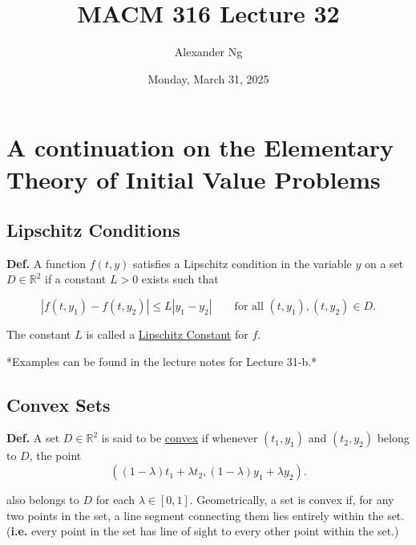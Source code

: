 \documentclass[12pt]{article}
\newcommand{\defn}{\textbf{Def.}\xspace}
\newcommand{\ie}{\textbf{i.e.}\xspace}
\begin{document}
\title{MACM 316 Lecture 32}
\author{Alexander Ng}
\date{Monday, March 31, 2025}

\maketitle

\section{A continuation on the Elementary Theory of Initial Value Problems}

\subsection{Lipschitz Conditions}

\defn A function $f(t,y)$ satisfies a Lipschitz condition in the variable $y$ on
a set $D \in \mathbb{R}^2$ if a constant $L > 0$ exists such that

\[
  |f(t,y_1) - f(t, y_2)| \leq L|y_1 - y_2| \qquad \text{for all } (t,y_1), (t,y_2) \in D
.\]

The constant $L$ is called a \uline{Lipschitz Constant} for $f$.

*Examples can be found in the lecture notes for Lecture 31-b.*

\subsection{Convex Sets}

\defn A set $D\in \mathbb{R}^2$ is said to be \uline{convex} if whenever $(t_1,
y_1)$ and $(t_2,y_2)$ belong to $D$, the point
\begin{equation*}
  ((1-\lambda)t_1 + \lambda t_2, (1-\lambda)y_1 + \lambda y_2)
.\end{equation*}

\noindent
also belongs to $D$ for each $\lambda\in[0,1]$. Geometrically, a set is convex
if, for any two points in the set, a line segment connecting them lies entirely
within the set. (\ie every point in the set has line of sight to every other
point within the set.)

\end{document}
